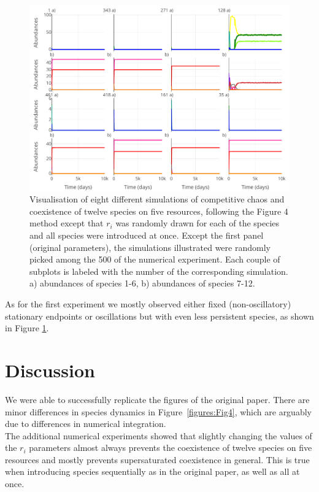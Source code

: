 \begin{figure}[H]
\begin{center} 
 \includegraphics[width=1\textwidth]{../Code/Figures/Figure_exp2.pdf}
  \caption{Visualisation of eight different simulations of competitive chaos and coexistence of twelve species on five resources, following the Figure 4 method except that $r_i$ was randomly drawn for each of the species and all species were introduced at once. Except the first panel (original parameters), the simulations illustrated were randomly picked among the 500 of the numerical experiment. Each couple of subplots is labeled with the number of the corresponding simulation. a) abundances of species 1-6, b) abundances of species 7-12.}
  \label{figures:Figexp2}
\end{center}
\end{figure}

As for the first experiment we mostly observed either fixed (non-oscillatory) stationary endpoints or oscillations but with even less persistent species, as shown in Figure \ref{figures:Figexp2}.

\section{Discussion}

We were able to successfully replicate the figures of the original paper. There are minor differences in species dynamics in Figure~\ref{figures:Fig4}, which are arguably due to differences in numerical integration.\\

The additional numerical experiments showed that slightly changing the values of the $r_i$ parameters almost always prevents the coexistence of twelve species on five resources and mostly prevents supersaturated coexistence in general. This is true when introducing species sequentially as in the original paper, as well as all at once.\\

